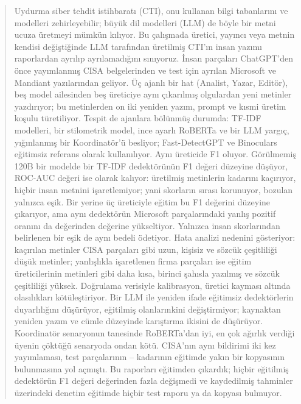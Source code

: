 \documentclass[journal]{IEEEtran}
\begin{document}
\begin{abstract}
Uydurma siber tehdit istihbaratı (CTI), onu kullanan bilgi tabanlarını ve modelleri zehirleyebilir; büyük dil
modelleri (LLM) de böyle bir metni ucuza üretmeyi mümkün kılıyor. Bu çalışmada üretici, yayıncı veya metnin kendisi
değiştiğinde LLM tarafından üretilmiş CTI'ın insan yazımı raporlardan ayrılıp ayrılamadığını sınıyoruz. İnsan
parçaları ChatGPT'den önce yayımlanmış CISA belgelerinden ve test için ayrılan Microsoft ve Mandiant yazılarından
geliyor. Üç ajanlı bir hat (Analist, Yazar, Editör), beş model ailesinden beş üreticiye aynı çıkarılmış olgulardan
yeni metinler yazdırıyor; bu metinlerden on iki yeniden yazım, prompt ve kısmi üretim koşulu türetiliyor. Tespit de
ajanlara bölünmüş durumda: TF-IDF modelleri, bir stilometrik model, ince ayarlı RoBERTa ve bir LLM yargıç,
yığınlanmış bir Koordinatör'ü besliyor; Fast-DetectGPT ve Binoculars eğitimsiz referans olarak kullanılıyor. Aynı
üreticide F1 \FoneInCoord{} oluyor. Görülmemiş 120B bir modelde bir TF-IDF dedektörünün F1 değeri \FoneDLexLR{}
düzeyine düşüyor, ROC-AUC değeri ise \AucDLexLR{} olarak kalıyor: üretilmiş metinlerin \NgDLexlrFnr{} kadarını
kaçırıyor, hiçbir insan metnini işaretlemiyor; yani skorların sırası korunuyor, bozulan yalnızca eşik. Bir yerine üç üreticiyle eğitim bu F1 değerini
\PoolDLexLR{} düzeyine çıkarıyor, ama aynı dedektörün Microsoft parçalarındaki yanlış pozitif oranını da
\PoolfprOneMicrosoftLexlr{} değerinden \PoolfprThreeMicrosoftLexlr{} değerine yükseltiyor. Yalnızca insan
skorlarından belirlenen bir eşik de aynı bedeli ödetiyor. Hata analizi nedenini gösteriyor: kaçırılan metinler CISA
parçaları gibi uzun, kişisiz ve sözcük çeşitliliği düşük metinler; yanlışlıkla işaretlenen firma parçaları ise eğitim
üreticilerinin metinleri gibi daha kısa, birinci şahısla yazılmış ve sözcük çeşitliliği yüksek. Doğrulama verisiyle
kalibrasyon, üretici kayması altında olasılıkları kötüleştiriyor. Bir LLM ile yeniden ifade eğitimsiz dedektörlerin
duyarlılığını düşürüyor, eğitilmiş olanlarınkini değiştirmiyor; kaynaktan yeniden yazım ve cümle düzeyinde
karıştırma ikisini de düşürüyor. Koordinatör \GapN{} senaryonun \GapWins{} tanesinde RoBERTa'dan iyi, en çok ağırlık
verdiği üyenin çöktüğü \GapLosses{} senaryoda ondan kötü. CISA'nın aynı bildirimi iki kez yayımlaması, test
parçalarının \LeakPlainDupShareMin{}--\LeakPlainDupShareMax{} kadarının eğitimde yakın bir kopyasının bulunmasına yol
açmıştı. Bu raporları eğitimden çıkardık; hiçbir eğitilmiş dedektörün F1 değeri \LeakMaxDeltaPurgeFOne{} değerinden
fazla değişmedi ve kaydedilmiş tahminler üzerindeki denetim eğitimde hiçbir test raporu ya da kopyası bulmuyor.
\end{abstract}
\end{document}
